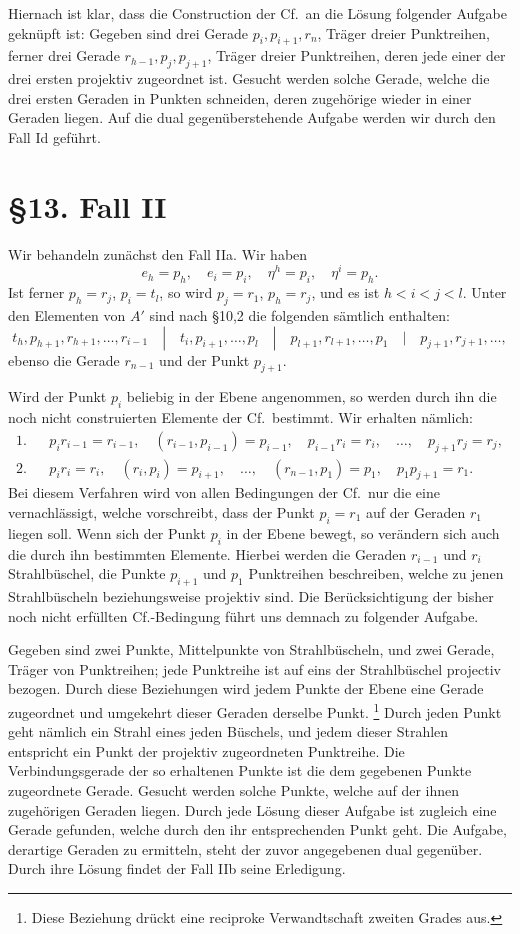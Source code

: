 \documentclass[11pt]{article}
\newcommand{\Cf}{\textup{Cf.}}
\begin{document}
Hiernach ist klar, dass die Construction der \Cf\ an die Lösung folgender Aufgabe geknüpft ist: Gegeben sind drei Gerade $p_i,p_{i+1},r_n$, Träger dreier Punktreihen, ferner drei Gerade $r_{h-1},p_j,p_{j+1}$, Träger dreier Punktreihen, deren jede einer der drei ersten projektiv zugeordnet ist. Gesucht werden solche Gerade, welche die drei ersten Geraden in Punkten schneiden, deren zugehörige wieder in einer Geraden liegen. Auf die dual gegenüberstehende Aufgabe werden wir durch den Fall Id geführt.

\section*{\S 13. Fall II}
Wir behandeln zunächst den Fall IIa. Wir haben
\[
e_h=p_h,
\quad e_i=p_i,
\quad \eta^h=p_i,
\quad \eta^i=p_h.
\]
Ist ferner $p_h=r_j$, $p_i=t_l$, so wird $p_j=r_1$, $p_h=r_j$, und es ist $h<i<j<l$. Unter den Elementen von $A'$ sind nach \S 10,2 die folgenden sämtlich enthalten:
\[
t_h,p_{h+1},r_{h+1},\ldots,r_{i-1}
\quad |\quad
 t_i,p_{i+1},\ldots,p_l
\quad |\quad
p_{l+1},r_{l+1},\ldots,p_1
\quad |\quad
p_{j+1},r_{j+1},\ldots,
\]
ebenso die Gerade $r_{n-1}$ und der Punkt $p_{j+1}$.

Wird der Punkt $p_i$ beliebig in der Ebene angenommen, so werden durch ihn die noch nicht construierten Elemente der \Cf\ bestimmt. Wir erhalten nämlich:
\[
\begin{array}{rcl}
1.&&p_i r_{i-1}=r_{i-1},
\quad (r_{i-1},p_{i-1})=p_{i-1},
\quad p_{i-1}r_i=r_i,
\quad \ldots,
\quad p_{j+1}r_j=r_j,\\
2.&&p_i r_i=r_i,
\quad (r_i,p_i)=p_{i+1},
\quad \ldots,
\quad (r_{n-1},p_1)=p_1,
\quad p_1p_{j+1}=r_1.
\end{array}
\]
Bei diesem Verfahren wird von allen Bedingungen der \Cf\ nur die eine vernachlässigt, welche vorschreibt, dass der Punkt $p_i=r_1$ auf der Geraden $r_1$ liegen soll. Wenn sich der Punkt $p_i$ in der Ebene bewegt, so verändern sich auch die durch ihn bestimmten Elemente. Hierbei werden die Geraden $r_{i-1}$ und $r_i$ Strahlbüschel, die Punkte $p_{i+1}$ und $p_1$ Punktreihen beschreiben, welche zu jenen Strahlbüscheln beziehungsweise projektiv sind. Die Berücksichtigung der bisher noch nicht erfüllten \Cf-Bedingung führt uns demnach zu folgender Aufgabe.

Gegeben sind zwei Punkte, Mittelpunkte von Strahlbüscheln, und zwei Gerade, Träger von Punktreihen; jede Punktreihe ist auf eins der Strahlbüschel projectiv bezogen. Durch diese Beziehungen wird jedem Punkte der Ebene eine Gerade zugeordnet und umgekehrt dieser Geraden derselbe Punkt.
\footnote{Diese Beziehung drückt eine reciproke Verwandtschaft zweiten Grades aus.}
Durch jeden Punkt geht nämlich ein Strahl eines jeden Büschels, und jedem dieser Strahlen entspricht ein Punkt der projektiv zugeordneten Punktreihe. Die Verbindungsgerade der so erhaltenen Punkte ist die dem gegebenen Punkte zugeordnete Gerade. Gesucht werden solche Punkte, welche auf der ihnen zugehörigen Geraden liegen. Durch jede Lösung dieser Aufgabe ist zugleich eine Gerade gefunden, welche durch den ihr entsprechenden Punkt geht. Die Aufgabe, derartige Geraden zu ermitteln, steht der zuvor angegebenen dual gegenüber. Durch ihre Lösung findet der Fall IIb seine Erledigung.
\end{document}
